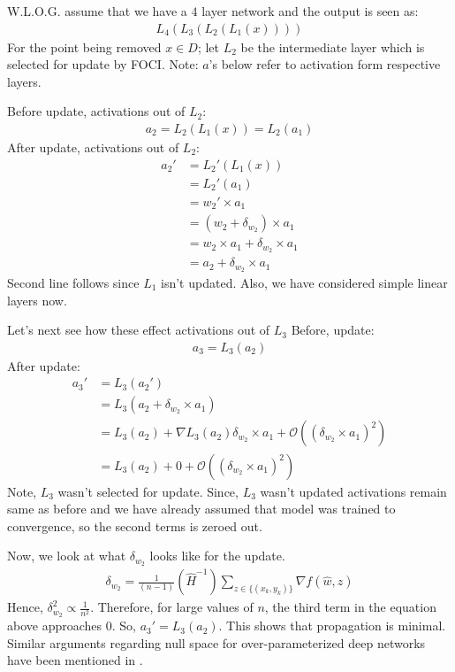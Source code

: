 W.L.O.G. assume that we have a $4$ layer network and the output is seen as:
\begin{align}
    L_4(L_3(L_2(L_1(x))))
\end{align}
For the point being removed $x \in D$; let $L_2$ be the intermediate layer which is selected for update by FOCI. Note: $a$'s below refer to activation form respective layers. 

Before update, activations out of $L_2$:
\begin{align}
    a_2 = L_2(L_1(x)) = L_2(a_1)
\end{align}
After update, activations out of $L_2$:
\begin{align}
    a_2' & = L_2'(L_1(x)) \\
    & = L_2'(a_1) \\
    & = w_2' \times a_1 \\
    & = (w_2 + \delta_{w_2}) \times a_1 \\
    & = w_2 \times a_1 + \delta_{w_2} \times a_1 \\
    & = a_2 + \delta_{w_2} \times a_1
\end{align}
Second line follows since $L_1$ isn't updated. Also, we have considered simple linear layers now. 

Let's next see how these effect activations out of $L_3$
Before, update:
\begin{align}
    a_3 = L_3(a_2)
\end{align}
After update:
\begin{align}
    a_3' &= L_3(a_2') \\
    &= L_3(a_2 + \delta_{w_2} \times a_1) \\
    &= L_3(a_2) + \nabla L_3 (a_2) \delta_w_2 \times a_1 + \mathcal{O}((\delta_{w_2} \times a_1)^2) \\
    &= L_3(a_2) + 0 + \mathcal{O}((\delta_{w_2} \times a_1)^2) 
\end{align}
Note, $L_3$ wasn't selected for update. Since, $L_3$ wasn't updated activations remain same as before and we have already assumed that model was trained to convergence, so the second terms is zeroed out. 

Now, we look at what $\delta_{w_2}$ looks like for the \cite{sekhari2021remember} update.
\begin{align}
    \delta_{w_2} = \frac{1}{(n-1)}(\hat{H}^{-1})\sum_{z \in \{(x_k, y_k)\}} \nabla f(\hat{w}, z)
\end{align}
Hence, $\delta_{w_2}^2 \propto \frac{1}{n^2}$. Therefore, for large values of $n$, the third term in the equation above approaches $0$. So, $a_3' = L_3(a_2)$. This shows that propagation is minimal. Similar arguments regarding null space for over-parameterized deep networks have been mentioned in \cite{golatkar2020forgetting}. 

